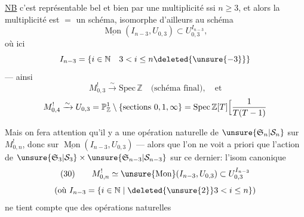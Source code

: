 
\uline{NB} c'est  représentable bel et bien par une multiplicité ssi $n\geq3$,  et alors la multiplicité est $=$ un schéma, isomorphe d'ailleurs  au schéma
\[
\underline{\operatorname{Mon}}(I_{n-3},U_{0,3})\subset U_{0,3}^{I_{n-3}},
\]
où ici
\[
I_{n-3}=\{i\in\mathbb N\quad3<i\leq n\deleted{\unsure{-3}}\}
\]
--- ainsi 
\[
M_{0,3}^{!}\xrightarrow{\sim}\mathrm{Spec}\,\mathbb Z\quad\text{(schéma final)},\quad\text{et}
\]
\[
M_{0,4}^{!}\xrightarrow{\sim}U_{0,3}=\mathbb P^1_{\mathbb Z}\setminus\{\text{sections }0,1,\infty\}=\mathrm{Spec}\,\mathbb Z[T]\Bigl[\frac{1}{T(T-1)}
\]

Mais on fera attention qu'il y a une opération naturelle de $\unsure{\mathfrak S_n|\mathcal S_n}$ sur $M_{0,n}^{!}$, donc sur $\underline{\operatorname{Mon}}(I_{n-3},U_{0,3})$ ---  alors que l'on ne voit a priori que l'action de $\unsure{\mathfrak S_3|\mathcal S_3}\times\unsure{\mathfrak S_{n-3}|\mathcal S_{n-3}}$ sur ce dernier: l'isom canonique
\[
(30)\qquad M_{0,n}^{!}\simeq\unsure{\operatorname{Mon}}(I_{n-3},U_{0,3})\subset U_{0,3}^{I_{n-3}}
\]
\[
\text{(où }I_{n-3}=\{i\in\mathbb N\mid\deleted{\unsure{2}}3<i\leq n\}\text{)}
\]
ne tient compte que des opérations naturelles 
